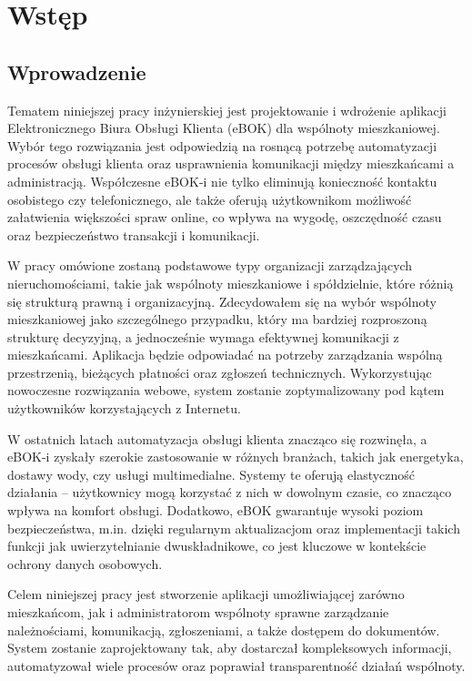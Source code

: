 \chapter{Wstęp}
\section{Wprowadzenie}
Tematem niniejszej pracy inżynierskiej jest projektowanie i wdrożenie aplikacji Elektronicznego Biura Obsługi Klienta (eBOK) dla wspólnoty mieszkaniowej. Wybór tego rozwiązania jest odpowiedzią na rosnącą potrzebę automatyzacji procesów obsługi klienta oraz usprawnienia komunikacji między mieszkańcami a administracją. Współczesne eBOK-i nie tylko eliminują konieczność kontaktu osobistego czy telefonicznego, ale także oferują użytkownikom możliwość załatwienia większości spraw online, co wpływa na wygodę, oszczędność czasu oraz bezpieczeństwo transakcji i komunikacji.

W pracy omówione zostaną podstawowe typy organizacji zarządzających nieruchomościami, takie jak wspólnoty mieszkaniowe i spółdzielnie, które różnią się strukturą prawną i organizacyjną. Zdecydowałem się na wybór wspólnoty mieszkaniowej jako szczególnego przypadku, który ma bardziej rozproszoną strukturę decyzyjną, a jednocześnie wymaga efektywnej komunikacji z mieszkańcami. Aplikacja będzie odpowiadać na potrzeby zarządzania wspólną przestrzenią, bieżących płatności oraz zgłoszeń technicznych. Wykorzystując nowoczesne rozwiązania webowe, system zostanie zoptymalizowany pod kątem użytkowników korzystających z Internetu.

W ostatnich latach automatyzacja obsługi klienta znacząco się rozwinęła, a eBOK-i zyskały szerokie zastosowanie w różnych branżach, takich jak energetyka, dostawy wody, czy usługi multimedialne. Systemy te oferują elastyczność działania – użytkownicy mogą korzystać z nich w dowolnym czasie, co znacząco wpływa na komfort obsługi. Dodatkowo, eBOK gwarantuje wysoki poziom bezpieczeństwa, m.in. dzięki regularnym aktualizacjom oraz implementacji takich funkcji jak uwierzytelnianie dwuskładnikowe, co jest kluczowe w kontekście ochrony danych osobowych.

Celem niniejszej pracy jest stworzenie aplikacji umożliwiającej zarówno mieszkańcom, jak i administratorom wspólnoty sprawne zarządzanie należnościami, komunikacją, zgłoszeniami, a także dostępem do dokumentów. System zostanie zaprojektowany tak, aby dostarczał kompleksowych informacji, automatyzował wiele procesów oraz poprawiał transparentność działań wspólnoty.

